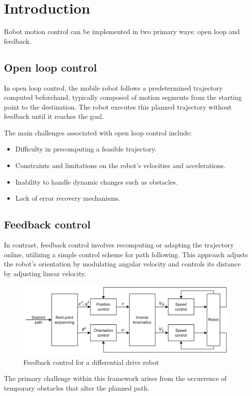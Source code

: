 \section{Introduction}

Robot motion control can be implemented in two primary ways: open loop and feedback.

\subsection{Open loop control}
In open loop control, the mobile robot follows a predetermined trajectory computed beforehand, typically composed of motion segments from the starting point to the destination. 
The robot executes this planned trajectory without feedback until it reaches the goal.

The main challenges associated with open loop control include:
\begin{itemize}
    \item Difficulty in precomputing a feasible trajectory.
    \item Constraints and limitations on the robot's velocities and accelerations.
    \item Inability to handle dynamic changes such as obstacles.
    \item Lack of error recovery mechanisms.
\end{itemize}

\subsection{Feedback control}
In contrast, feedback control involves recomputing or adapting the trajectory online, utilizing a simple control scheme for path following. 
This approach adjusts the robot's orientation by modulating angular velocity and controls its distance by adjusting linear velocity.
\begin{figure}[H]
    \centering
    \includegraphics[width=0.75\linewidth]{images/fed.png}
    \caption{Feedback control for a differential drive robot}
\end{figure}
The primary challenge within this framework arises from the occurrence of temporary obstacles that alter the planned path.